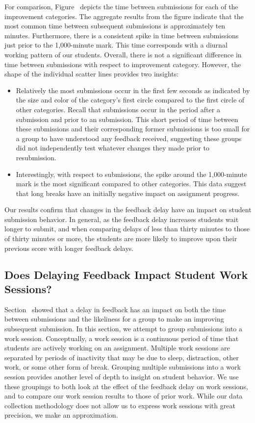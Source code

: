 For comparison, Figure~ depicts the time between
submissions for each of the improvement categories. The aggregate results from
the figure indicate that the most common time between subsequent submissions is
approximately ten minutes. Furthermore, there is a consistent spike in time
between submissions just prior to the 1,000-minute mark. This time corresponds
with a diurnal working pattern of our students. Overall, there is not a
significant difference in time between submissions with respect to improvement
category. However, the shape of the individual scatter lines provides two
insights:

\begin{itemize}
\item Relatively the most \noii{} submissions occur in the first few seconds as
  indicated by the size and color of the \noii{} category's first circle
  compared to the first circle of other categories. Recall that \noii{}
  submissions occur in the period after a \worse{} submission and prior to an
  \imp{} submission. This short period of time between these submissions and
  their corresponding former submissions is too small for a group to have
  understood any feedback received, suggesting these groups did not
  independently test whatever changes they made prior to resubmission.
\item Interestingly, with respect to \worse{} submissions, the spike around the
  1,000-minute mark is the most significant compared to other categories. This
  data suggest that long breaks have an initially negative impact on assignment
  progress.
\end{itemize}

Our results confirm that changes in the feedback delay have an impact on
student submission behavior. In general, as the feedback delay increases
students wait longer to submit, and when comparing delays of less than thirty
minutes to those of thirty minutes or more, the students are more likely to
improve upon their previous score with longer feedback delays.

\subsection{Does Delaying Feedback Impact Student Work Sessions?}

Section~ showed that a delay in feedback has an impact
on both the time between submissions and the likeliness for a group to make an
improving subsequent submission. In this section, we attempt to group
submissions into a work session. Conceptually, a work session is a continuous
period of time that students are actively working on an assignment. Multiple
work sessions are separated by periods of inactivity that may be due to sleep,
distraction, other work, or some other form of break. Grouping multiple
submissions into a work session provides another level of depth to insight on
student behavior. We use these groupings to both look at the effect of the
feedback delay on work sessions, and to compare our work session results to
those of prior work. While our data collection methodology does not allow us to
express work sessions with great precision, we make an approximation.

